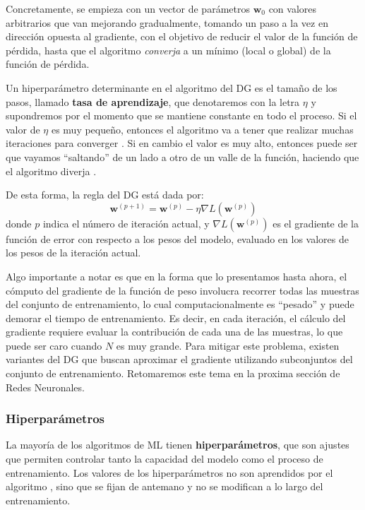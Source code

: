 \documentclass[../../main.tex]{subfiles}
\begin{document}
Concretamente, se empieza con un vector de parámetros \(\bm{w}_0\) con valores arbitrarios
que van mejorando gradualmente, tomando un paso a la vez en dirección opuesta al gradiente,
con el objetivo de reducir el valor de la función de pérdida, hasta que el algoritmo
\textit{converja} a un mínimo (local o global) de la función de pérdida.

Un hiperparámetro\footnotemark{} determinante en el algoritmo del DG es el tamaño de los
pasos, llamado \textbf{tasa de aprendizaje}, que denotaremos con la letra \(\eta\) y
supondremos por el momento que se mantiene constante en todo el proceso. Si el valor de
\(\eta\) es muy pequeño, entonces el algoritmo va a tener que realizar muchas iteraciones
para converger \cite{hands-on-ML-sklearn-tf}. Si en cambio el valor es muy alto, entonces
puede ser que vayamos ``saltando'' de un lado a otro de un valle de la función, haciendo
que el algoritmo diverja \cite{hands-on-ML-sklearn-tf}. 

De esta forma, la regla del DG está dada por:
\[
\bm{w}^{(p+1)} = \bm{w}^{(p)} - \eta \nabla L(\bm{w}^{(p)})
\]
donde \(p\) indica el número de iteración actual, y \(\nabla L(\bm{w}^{(p)})\) es el
gradiente de la función de error con respecto a los pesos del modelo, evaluado en los
valores de los pesos de la iteración actual.

Algo importante a notar es que en la forma que lo presentamos hasta ahora, el cómputo del
gradiente de la función de peso involucra recorrer todas las muestras del conjunto de
entrenamiento, lo cual computacionalmente es ``pesado'' y puede demorar el tiempo de
entrenamiento. Es decir, en cada iteración, el cálculo del gradiente requiere evaluar la
contribución de cada una de las muestras, lo que puede ser caro cuando \(N\) es muy
grande. Para mitigar este problema, existen variantes del DG que buscan aproximar
el gradiente utilizando subconjuntos del conjunto de entrenamiento. Retomaremos este tema
en la proxima sección de Redes Neuronales.

\subsubsection{Hiperparámetros}
La mayoría de los algoritmos de ML tienen \textbf{hiperparámetros}, que son ajustes que
permiten controlar tanto la capacidad del modelo como el proceso de entrenamiento. Los
valores de los hiperparámetros no son aprendidos por el algoritmo \cite{deep-learning},
sino que se fijan de antemano y no se modifican a lo largo del entrenamiento.
\end{document}
